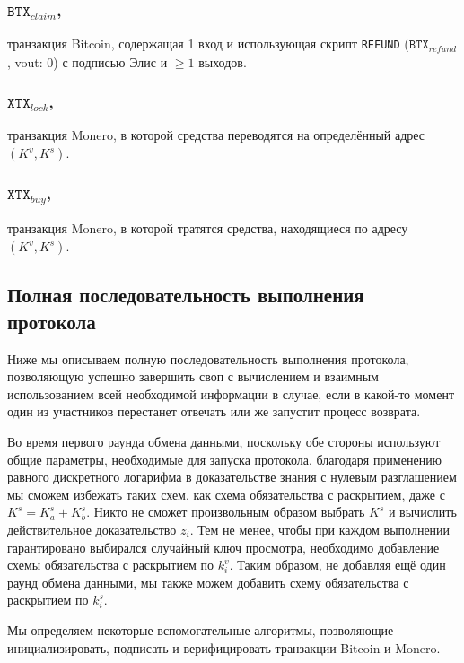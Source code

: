 \documentclass{llncs}
\newcommand{\BTX}{\texttt{BTX}}
\newcommand{\XTX}{\texttt{XTX}}
\begin{document}
\subsubsection{$\BTX_\textit{claim}$,}
транзакция Bitcoin, содержащая 1 вход и использующая скрипт \texttt{REFUND} ($\BTX_\textit{refund}$, vout: 0) с подписью Элис и $\geq 1$ выходов.

\subsubsection{$\XTX_\textit{lock}$,}
транзакция Monero, в которой средства переводятся на определённый адрес $(K^v,K^s)$.

\subsubsection{$\XTX_\textit{buy}$,}
транзакция Monero, в которой тратятся средства, находящиеся по адресу $(K^v,K^s)$.

\subsection{Полная последовательность выполнения протокола}
Ниже мы описываем полную последовательность выполнения протокола, позволяющую успешно завершить своп с вычислением и взаимным использованием всей необходимой информации в случае, если в какой-то момент один из участников перестанет отвечать или же  запустит процесс возврата.

Во время первого раунда обмена данными, поскольку обе стороны используют общие параметры, необходимые для запуска протокола, благодаря применению равного дискретного логарифма в доказательстве знания с нулевым разглашением мы сможем избежать таких схем, как схема обязательства с раскрытием, даже с $K^s = K^s_a + K^s_b$. Никто не сможет произвольным образом выбрать $K^s$ и вычислить действительное доказательство $z_i$. Тем не менее, чтобы при каждом выполнении гарантировано выбирался случайный ключ просмотра, необходимо добавление схемы обязательства с раскрытием по $k^v_i$. Таким образом, не добавляя ещё один раунд обмена данными, мы также можем добавить схему обязательства с раскрытием по $k^s_i$.

Мы определяем некоторые вспомогательные алгоритмы, позволяющие инициализировать, подписать и верифицировать транзакции Bitcoin и Monero.
\end{document}
